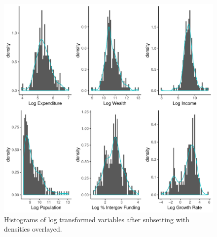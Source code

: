 \documentclass{article}\usepackage[]{graphicx}\usepackage[]{color}
\makeatletter
\def\maxwidth{ %
  \ifdim\Gin@nat@width>\linewidth
    \linewidth
  \else
    \Gin@nat@width
  \fi
}
\newenvironment{knitrout}{}{} %
\makeatother
\begin{document}
\begin{appendices}
\begin{knitrout}
\color{fgcolor}\begin{figure}
\includegraphics[width=\maxwidth]{figure/r_append_log_hist_subset-1} \caption[Histograms of log transformed variables after subsetting with densities overlayed]{Histograms of log transformed variables after subsetting with densities overlayed.}\label{fig:r append_log_hist_subset}
\end{figure}


\end{knitrout}



\end{appendices}
\end{document}
